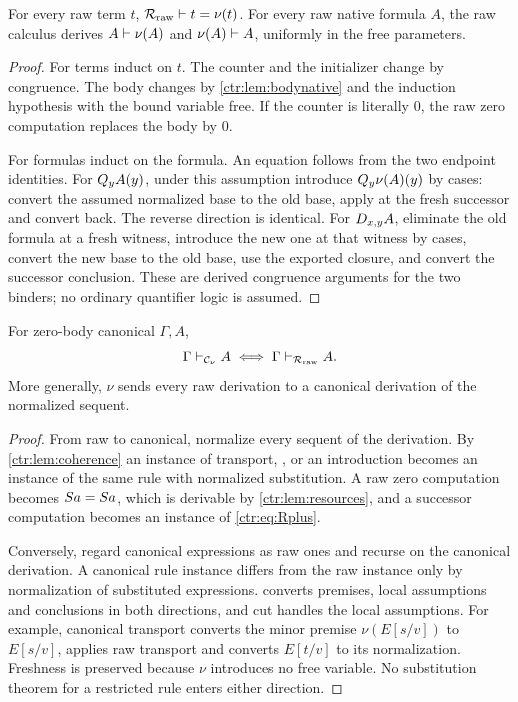 \begin{lemma}\label{ctr:lem:normaleq}
For every raw term $t$, $\mathcal R_{\mathrm{raw}}\vdash t=\nu(t)$. For every raw native
formula $A$, the raw calculus derives $A\vdash\nu(A)$ and $\nu(A)\vdash A$, uniformly in
the free parameters.
\end{lemma}
\begin{proof}
For terms induct on $t$. The counter and the initializer change by congruence. The body
changes by \cref{ctr:lem:bodynative} and the induction hypothesis with the bound variable
free. If the counter is literally $0$, the raw zero computation replaces the body by $0$.

For formulas induct on the formula. An equation follows from the two endpoint identities.
For $Q_{y}A(y)$, under this assumption introduce $Q_{y}\nu(A)(y)$ by cases: convert the
assumed normalized base to the old base, apply  at the fresh successor and
convert back. The reverse direction is identical. For $D_{x,y}A$, eliminate the old
formula at a fresh witness, introduce the new one at that witness by cases, convert the new
base to the old base, use the exported closure, and convert the successor conclusion. These
are derived congruence arguments for the two binders; no ordinary quantifier logic is
assumed.
\end{proof}

\begin{theorem}\label{ctr:thm:canonical}
For zero-body canonical $\Gamma,A$,
\[
 \Gamma\vdash_{\mathcal C_\nu}A\iff\Gamma\vdash_{\mathcal R_{\mathrm{raw}}}A .
\]
More generally, $\nu$ sends every raw derivation to a canonical derivation of the
normalized sequent.
\end{theorem}
\begin{proof}
From raw to canonical, normalize every sequent of the derivation. By
\cref{ctr:lem:coherence} an instance of transport, ,  or an
introduction becomes an instance of the same rule with normalized substitution. A raw zero
computation becomes $S a=S a$, which is derivable by \cref{ctr:lem:resources}, and a
successor computation becomes an instance of \eqref{ctr:eq:Rplus}.

Conversely, regard canonical expressions as raw ones and recurse on the canonical
derivation. A canonical rule instance differs from the raw instance only by normalization of
substituted expressions.  converts premises, local assumptions and
conclusions in both directions, and cut handles the local assumptions. For example,
canonical transport converts the minor premise $\nu(E[s/v])$ to $E[s/v]$, applies raw
transport and converts $E[t/v]$ to its normalization. Freshness is preserved because $\nu$
introduces no free variable. No substitution theorem for a restricted rule enters either
direction.
\end{proof}


